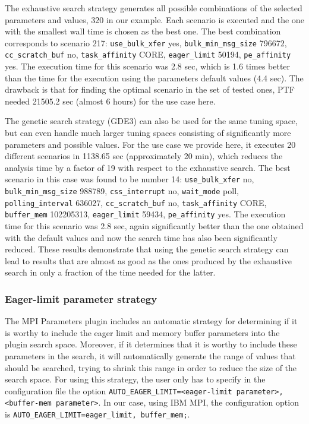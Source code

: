 The exhaustive search strategy generates all possible combinations of the selected parameters and values, 320 in our example. Each scenario is executed and the one with the smallest wall time is chosen as the best one. The best combination corresponds to scenario 217: {\tt use\_bulk\_xfer} yes, {\tt bulk\_min\_msg\_size} 796672, {\tt cc\_scratch\_buf} no, {\tt task\_affinity} CORE, {\tt eager\_limit} 50194, {\tt pe\_affinity} yes. The execution time for this scenario was 2.8 sec, which is 1.6 times better than the time for the execution using the parameters default values (4.4 sec). The drawback is that for finding the optimal scenario in the set of tested ones, PTF needed 21505.2 sec (almost 6 hours) for the use case here.

The genetic search strategy (GDE3) can also be used for the same tuning space, but can even handle much larger tuning spaces consisting of significantly more parameters and possible values. For the use case we provide here, it executes 20 different scenarios in 1138.65 sec (approximately 20 min), which reduces the analysis time by a factor of 19 with respect to the exhaustive search. The best scenario in this case was found to be number 14: {\tt use\_bulk\_xfer} no, {\tt bulk\_min\_msg\_size} 988789, {\tt css\_interrupt} no, {\tt wait\_mode} poll, {\tt polling\_interval} 636027, {\tt cc\_scratch\_buf} no, {\tt task\_affinity} CORE, {\tt buffer\_mem} 102205313, {\tt eager\_limit} 59434, {\tt pe\_affinity} yes. The execution time for this scenario was 2.8 sec, again significantly better than the one obtained with the default values and now the search time has also been significantly reduced.  These results demonstrate that using the genetic search strategy can lead to results that are almost as good as the ones produced by the exhaustive search in only a fraction of the time needed for the latter.

\subsubsection{Eager-limit parameter strategy}\label{para:MPI-gen}

The MPI Parameters plugin includes an automatic strategy for determining if it is worthy to include the eager limit and memory buffer parameters into the plugin search space. Moreover, if it determines that it is worthy to include these parameters in the search, it will automatically generate the range of values that should be searched, trying to shrink this range in order to reduce the size of the search space. For using this strategy, the user only has to specify in the configuration file the option {\tt AUTO\_EAGER\_LIMIT=<eager-limit parameter>,<buffer-mem parameter>}. In our case, using IBM MPI, the configuration option is {\tt AUTO\_EAGER\_LIMIT=eager\_limit, buffer\_mem;}.

